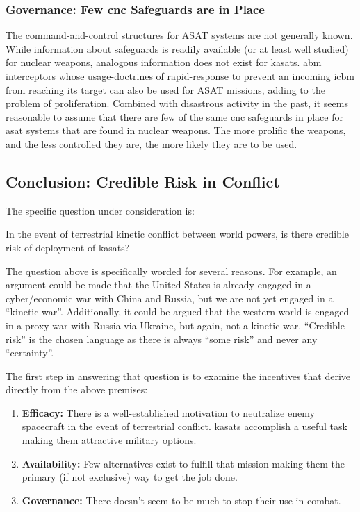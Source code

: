 \subsubsection{Governance: Few \ac{cnc} Safeguards are in Place}
The command-and-control structures for ASAT systems are not generally
known.  While information about safeguards is readily available (or at
least well studied) for nuclear weapons, analogous information does
not exist for \acp{kasat}.  \ac{abm} interceptors whose
usage-doctrines of rapid-response to prevent an incoming \ac{icbm}
from reaching its target can also be used for ASAT missions, adding to
the problem of proliferation.  Combined with disastrous activity in
the past, it seems reasonable to assume that there are few of the same
\ac{cnc} safeguards in place for \ac{asat} systems that are found in
nuclear weapons.  The more prolific the weapons, and the less
controlled they are, the more likely they are to be used.

\subsection{Conclusion: Credible Risk in Conflict}

The specific question under consideration is:

\begin{blockquote}
  In the event of terrestrial kinetic conflict between world powers,
  is there credible risk of deployment of \acfp{kasat}?
\end{blockquote}

The question above is specifically worded for several reasons.  For
example, an argument could be made that the United States is already
engaged in a cyber/economic war with China and Russia, but we are not
yet engaged in a ``kinetic war''.  Additionally, it could be argued
that the western world is engaged in a proxy war with Russia via
Ukraine, but again, not a kinetic war.  ``Credible risk'' is the
chosen language as there is always ``some risk'' and never any
``certainty''.

The first step in answering that question is to examine the incentives
that derive directly from the above premises:

\begin{enumerate}

\item {\bf Efficacy:} There is a well-established motivation to
  neutralize enemy spacecraft in the event of terrestrial
  conflict.\cite{big-risks} \acfp{kasat} accomplish a useful task
  making them attractive military options.

\item {\bf Availability:} Few alternatives exist to fulfill that
  mission making them the primary (if not exclusive) way to get the
  job done.

\item {\bf Governance:} There doesn't seem to be much to stop their
  use in combat.

\end{enumerate}

